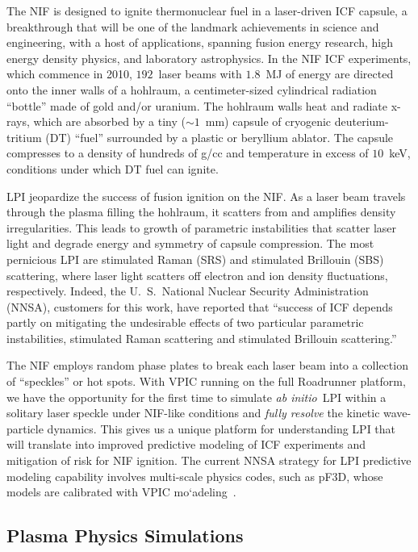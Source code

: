 \documentclass[journal,twoside]{IEEEtran}
\newcommand{\abinitio} {\textit{ab initio}}
\begin{document}
The NIF is designed to ignite thermonuclear fuel in a laser-driven ICF
capsule, a breakthrough that will be one of the landmark achievements
in science and engineering, with a host of applications, spanning
fusion energy research, high energy density physics, and laboratory
astrophysics.  In the NIF ICF experiments, which commence in 2010,
$192$~laser beams with $1.8$~MJ of energy are directed onto the inner
walls of a hohlraum, a centimeter-sized cylindrical radiation
``bottle'' made of gold and/or uranium.  The hohlraum walls heat and
radiate x-rays, which are absorbed by a tiny ($\sim 1$~mm) capsule of
cryogenic deuterium-tritium (DT) ``fuel'' surrounded by a plastic or
beryllium ablator.  The capsule compresses to a density of hundreds of
g/cc and temperature in excess of $10$~keV, conditions under which DT
fuel can ignite.

LPI jeopardize the success of fusion ignition on the NIF.  As a laser
beam travels through the plasma filling the hohlraum, it scatters from
and amplifies density irregularities.  This leads to growth of
parametric instabilities that scatter laser light and degrade energy
and symmetry of capsule compression.  The most pernicious LPI are
stimulated Raman (SRS) and stimulated Brillouin (SBS) scattering,
where laser light scatters off electron and ion density fluctuations,
respectively.  Indeed, the U.~S.~National Nuclear Security
Administration (NNSA), customers for this work, have reported that
``success of ICF depends partly on mitigating the undesirable effects
of two particular parametric instabilities, stimulated Raman
scattering and stimulated Brillouin
scattering.''~\cite{LLNL_LPI_webpage}

The NIF employs random phase plates to break each laser beam into a
collection of ``speckles'' or hot spots.  With VPIC running on the
full Roadrunner platform, we have the opportunity for the first time
to simulate \abinitio\ LPI within a solitary laser speckle under
NIF-like conditions and \textit{fully resolve} the kinetic
wave-particle dynamics.  This gives us a unique platform for
understanding LPI that will translate into improved predictive
modeling of ICF experiments and mitigation of risk for NIF ignition.
The current NNSA strategy for LPI predictive modeling capability
involves multi-scale physics codes, such as pF3D, whose models are
calibrated with VPIC mo`adeling~\cite{Glenzer_Nature_Physics_2007,
Labaune_Nature_Physics_2007}.

\subsection{Plasma Physics Simulations}
\end{document}
